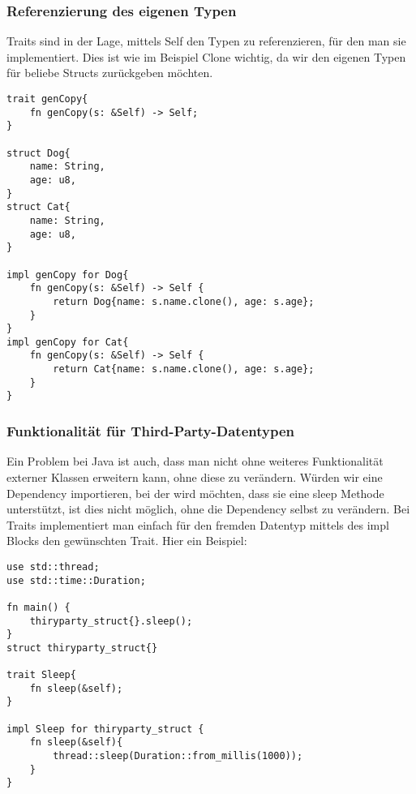\documentclass[a4paper, 1ppt]{article}
\begin{document}
\subsubsection{Referenzierung des eigenen Typen}
Traits sind in der Lage, mittels Self den Typen zu referenzieren, für den man sie implementiert.
Dies ist wie im Beispiel Clone wichtig, da wir den eigenen Typen für beliebe Structs zurückgeben möchten.
\begin{verbatim}
trait genCopy{
    fn genCopy(s: &Self) -> Self;
}

struct Dog{
    name: String,
    age: u8,
}
struct Cat{
    name: String,
    age: u8,
}

impl genCopy for Dog{
    fn genCopy(s: &Self) -> Self {
        return Dog{name: s.name.clone(), age: s.age};
    }
}
impl genCopy for Cat{
    fn genCopy(s: &Self) -> Self {
        return Cat{name: s.name.clone(), age: s.age};
    }
}
\end{verbatim}
\subsubsection{Funktionalität für Third-Party-Datentypen}
Ein Problem bei Java ist auch, dass man nicht ohne weiteres Funktionalität externer Klassen erweitern kann, ohne diese zu verändern.
Würden wir eine Dependency importieren, bei der wird möchten, dass sie eine sleep Methode unterstützt, ist dies nicht möglich, ohne die Dependency selbst zu verändern.
Bei Traits implementiert man einfach für den fremden Datentyp mittels des impl Blocks den gewünschten Trait.
Hier ein Beispiel:
\begin{verbatim}
use std::thread;
use std::time::Duration;

fn main() {
    thiryparty_struct{}.sleep();
}
struct thiryparty_struct{}

trait Sleep{
    fn sleep(&self);
}

impl Sleep for thiryparty_struct {
    fn sleep(&self){
        thread::sleep(Duration::from_millis(1000));
    }
}
\end{verbatim}
\end{document}
